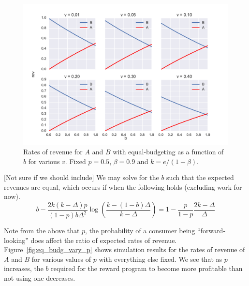 \begin{figure}[h!]
\begin{centering}
\includegraphics[scale = 0.75]{./figures/eq_budg_vary_v_p05.pdf}
\caption{Rates of revenue for $A$ and $B$ with equal-budgeting as a function of $b$ for various $v$. Fixed $p = 0.5$, $\beta = 0.9$ and $k = e/(1-\beta)$.}
\label{fig:eq_budg_vary_v}
\end{centering}
\end{figure}

[Not sure if we should include] We may solve for the $b$ such that the expected revenues are equal, which occurs if when the following holds (excluding work for now).
\begin{equation*}
b-\frac{2k(k-\Delta)p}{(1-p)b\Delta^2}\log \left(\frac{k-(1-b)\Delta}{k-\Delta} \right) = 1-\frac{p}{1-p} \frac{2k-\Delta}{\Delta}
\end{equation*}

Note from the above that $p$, the probability of a consumer being ``forward-looking'' does affect the ratio of expected rates of revenue. Figure~\ref{fig:eq_budg_vary_p} shows simulation results for the rates of revenue of $A$ and $B$ for various values of $p$ with everything else fixed. We see that as $p$ increases, the $b$ required for the reward program to become more profitable than not using one decreases.

